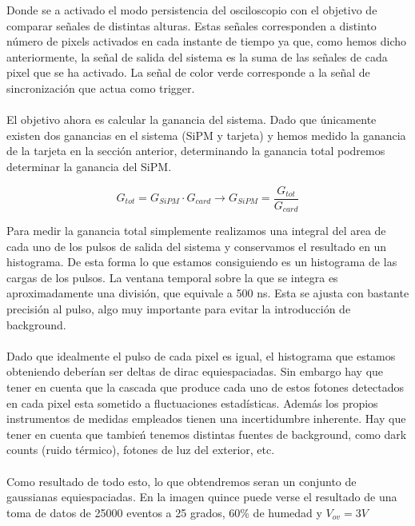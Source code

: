 \documentclass[11pt, a4paper]{article}
\begin{document}
Donde se a activado el modo persistencia del osciloscopio con el objetivo de comparar señales de distintas alturas. Estas señales corresponden a distinto número de pixels activados en cada instante de tiempo ya que, como hemos dicho anteriormente, la señal de salida del sistema es la suma de las señales de cada pixel que se ha activado. La señal de color verde corresponde a la señal de sincronización que actua como trigger.

\paragraph {}
El objetivo ahora es calcular la ganancia del sistema. Dado que únicamente existen dos ganancias en el sistema (SiPM y tarjeta) y hemos medido la ganancia de la tarjeta en la sección anterior, determinando la ganancia total podremos determinar la ganancia del SiPM. 

$$G_{tot}=G_{SiPM} \cdotp G_{card} \longrightarrow G_{SiPM} = \frac{G_{tot}}{G_{card}}$$

Para medir la ganancia total simplemente realizamos una integral del area de cada uno de los pulsos de salida del sistema y conservamos el resultado en un histograma. De esta forma lo que estamos consiguiendo es un histograma de las cargas de los pulsos. La ventana temporal sobre la que se integra es aproximadamente una división, que equivale a 500 ns. Esta se ajusta con bastante precisión al pulso, algo muy importante para evitar la introducción de background.

\paragraph {}
Dado que idealmente el pulso de cada pixel es igual, el histograma que estamos obteniendo deberían ser deltas de dirac equiespaciadas. Sin embargo hay que tener en cuenta que la cascada que produce cada uno de estos fotones detectados en cada pixel esta sometido a fluctuaciones estadísticas. Además los propios instrumentos de medidas empleados tienen una incertidumbre inherente. Hay que tener en cuenta que tambień tenemos distintas fuentes de background, como dark counts (ruido térmico), fotones de luz del exterior, etc. 

\paragraph {}
Como resultado de todo esto, lo que obtendremos seran un conjunto de gaussianas equiespaciadas. En la imagen quince puede verse el resultado de una toma de datos de 25000 eventos a 25 grados, 60\% de humedad y $V_{ov}=3V$
\end{document}
